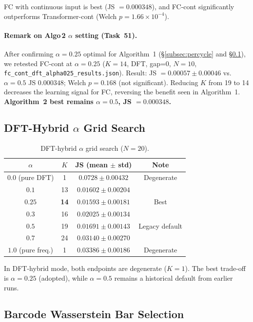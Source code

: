 \documentclass[conference,10pt,a4paper]{IEEEtran}
\begin{document}
FC with continuous input is best (JS $=0.000348$), and FC-cont
significantly outperforms Transformer-cont (Welch
$p = 1.66 \times 10^{-4}$).

\paragraph{Remark on Algo\,2 $\alpha$ setting (Task~51).}
After confirming $\alpha=0.25$ optimal for Algorithm~1
(\S\ref{subsec:percycle} and \S\ref{subsec:alpha}), we retested
FC-cont at $\alpha=0.25$ ($K=14$, DFT, gap=0, $N=10$,
\texttt{fc\_cont\_dft\_alpha025\_results.json}).
Result: JS $= 0.00057 \pm 0.00046$ vs.\ $\alpha=0.5$
JS $0.000348$; Welch $p = 0.168$ (not significant).
Reducing $K$ from 19 to 14 decreases the learning signal for FC,
reversing the benefit seen in Algorithm~1.
\textbf{Algorithm~2 best remains $\alpha=0.5$, JS $=0.000348$.}

\subsection{DFT-Hybrid $\alpha$ Grid Search}
\label{subsec:alpha}

\begin{table}[t]
\centering
\caption{DFT-hybrid $\alpha$ grid search ($N=20$).}
\label{tab:alpha}
\begin{tabular}{cccc}
\toprule
$\alpha$ & $K$ & JS (mean $\pm$ std) & Note \\
\midrule
$0.0$ (pure DFT) & 1  & $0.0728 \pm 0.00432$ & Degenerate \\
$0.1$            & 13 & $0.01602 \pm 0.00204$ &  \\
\textbf{$0.25$}  & \textbf{14} & \textbf{$0.01593 \pm 0.00181$} & Best \\
$0.3$            & 16 & $0.02025 \pm 0.00134$ &  \\
$0.5$            & 19 & $0.01691 \pm 0.00143$ & Legacy default \\
$0.7$            & 24 & $0.03140 \pm 0.00270$ &  \\
$1.0$ (pure freq.) & 1 & $0.03386 \pm 0.00186$ & Degenerate \\
\bottomrule
\end{tabular}
\end{table}

In DFT-hybrid mode, both endpoints are degenerate ($K=1$). The best
trade-off is $\alpha=0.25$ (adopted), while $\alpha=0.5$ remains a
historical default from earlier runs.

\subsection{Barcode Wasserstein Bar Selection}
\label{subsec:wasserstein}
\end{document}
